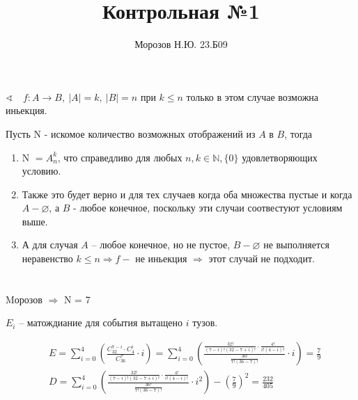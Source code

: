 \documentclass[a4paper, fontsize=12pt]{article}
\title{Контрольная №1}
\author{Морозов Н.Ю. 23.Б09}
\date{}
\begin{document}
    \maketitle  
        
    \section{}

    $ \sphericalangle \quad f : A \longrightarrow B,\ |A| = k,\ |B| = n$ при $ k \leqslant  n $ только в этом случае возможна иньекция. 

    \noindent Пусть N - искомое количество возможных отображений из $A$ в $B$, тогда

    \begin{enumerate}
        \item N $= A^k_n$, что справедливо для любых $n, k \in \mathbb{N}, \{0\} $ удовлетворяющих условию.
        \item Также это будет верно и для тех случаев когда оба множества пустые и когда $A - \varnothing $, а $B$ - любое
        конечное, поскольку эти случаи соотвестуют условиям выше.
        \item А для случая $A$ -- любое конечное, но не пустое, $B - \varnothing$  не выполняется неравенство 
        $ k \leqslant  n \Longrightarrow f -$ не иньекция $\Longrightarrow$ этот случай не подходит.
    \end{enumerate}

    \section{}

    Mорозов $ \Longrightarrow $ N = 7

   \noindent $E_i$ -- матождиание для события вытащено $i$ тузов.

   

    \begin{align*}
        &E = \sum_{i = 0}^{4} \left(\frac{C^{7-i}_{32} \cdot C^{i}_{4}}{C^7_{36}} \cdot i \right)  =
        \sum_{i=0}^{4} \left( \frac{\frac{32!}{(7-i)!(32-7+i)!} \cdot \frac{4!}{i!(4-i)!}}{\frac{36!}{7!(36 - 7)!}} \cdot i\right)  = \frac{7}{9}\\
        &D = \sum_{i=0}^{4} \left( \frac{\frac{32!}{(7-i)!(32-7+i)!} \cdot \frac{4!}{i!(4-i)!}}{\frac{36!}{7!(36 - 7)!}} \cdot i^2\right) - \left(\frac{7}{9}\right)^2 = \frac{232}{405}
    \end{align*}
\end{document}

